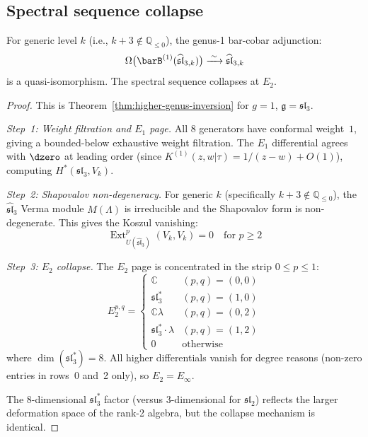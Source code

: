 \subsection{Spectral sequence collapse}

\begin{theorem}
\label{thm:sl3-genus1-inversion}
For generic level $k$ (i.e., $k+3 \notin \mathbb{Q}_{\leq 0}$), the genus-1 bar-cobar adjunction:
\begin{equation}
\Omega\bigl(\barB^{(1)}(\widehat{\mathfrak{sl}}_{3,k})\bigr) \xrightarrow{\;\sim\;} \widehat{\mathfrak{sl}}_{3,k}
\end{equation}
is a quasi-isomorphism.  The spectral sequence collapses at $E_2$.
\end{theorem}

\begin{proof}
This is Theorem~\ref{thm:higher-genus-inversion} for $g=1$, $\mathfrak{g}=\mathfrak{sl}_3$.

\emph{Step~1: Weight filtration and $E_1$ page.}
All $8$ generators have conformal weight~$1$, giving a bounded-below exhaustive weight filtration.  The $E_1$ differential agrees with $\dzero$ at leading order (since $K^{(1)}(z,w|\tau) = 1/(z-w) + O(1)$), computing $H^*(\mathfrak{sl}_3, V_k)$.

\emph{Step~2: Shapovalov non-degeneracy.}
For generic $k$ (specifically $k+3 \notin \mathbb{Q}_{\leq 0}$), the $\widehat{\mathfrak{sl}}_3$ Verma module $M(\Lambda)$ is irreducible and the Shapovalov form is non-degenerate.  This gives the Koszul vanishing:
\begin{equation}
\operatorname{Ext}^p_{U(\widehat{\mathfrak{sl}}_3)}(V_k, V_k) = 0 \quad \text{for } p \geq 2
\end{equation}

\emph{Step~3: $E_2$ collapse.}
The $E_2$ page is concentrated in the strip $0 \leq p \leq 1$:
\begin{equation}\label{eq:sl3-E2-page}
E_2^{p,q} = \begin{cases}
\mathbb{C} & (p,q) = (0,0) \\
\mathfrak{sl}_3^* & (p,q) = (1,0) \\
\mathbb{C}\lambda & (p,q) = (0,2) \\
\mathfrak{sl}_3^* \cdot \lambda & (p,q) = (1,2) \\
0 & \text{otherwise}
\end{cases}
\end{equation}
where $\dim(\mathfrak{sl}_3^*) = 8$.  All higher differentials vanish for degree reasons (non-zero entries in rows~0 and~2 only), so $E_2 = E_\infty$.

The 8-dimensional $\mathfrak{sl}_3^*$ factor (versus 3-dimensional for $\mathfrak{sl}_2$) reflects the larger deformation space of the rank-2 algebra, but the collapse mechanism is identical.
\end{proof}

